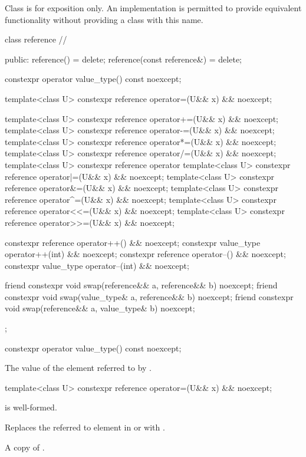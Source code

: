 \pnum
Class  is for exposition only. An implementation is permitted to provide equivalent functionality without providing a class with this name.

\begin{codeblock}
class reference // \expos
{
public:
  reference() = delete;
  reference(const reference&) = delete;

  constexpr operator value_type() const noexcept;

  template<class U> constexpr reference operator=(U&& x) && noexcept;

  template<class U> constexpr reference operator+=(U&& x) && noexcept;
  template<class U> constexpr reference operator-=(U&& x) && noexcept;
  template<class U> constexpr reference operator*=(U&& x) && noexcept;
  template<class U> constexpr reference operator/=(U&& x) && noexcept;
  template<class U> constexpr reference operator%
  template<class U> constexpr reference operator|=(U&& x) && noexcept;
  template<class U> constexpr reference operator&=(U&& x) && noexcept;
  template<class U> constexpr reference operator^=(U&& x) && noexcept;
  template<class U> constexpr reference operator<<=(U&& x) && noexcept;
  template<class U> constexpr reference operator>>=(U&& x) && noexcept;

  constexpr reference operator++() && noexcept;
  constexpr value_type operator++(int) && noexcept;
  constexpr reference operator--() && noexcept;
  constexpr value_type operator--(int) && noexcept;

  friend constexpr void swap(reference&& a, reference&& b) noexcept;
  friend constexpr void swap(value_type& a, reference&& b) noexcept;
  friend constexpr void swap(reference&& a, value_type& b) noexcept;
};
\end{codeblock}

\begin{itemdecl}
constexpr operator value_type() const noexcept;
\end{itemdecl}

\begin{itemdescr}
  \pnum\returns
  The value of the element referred to by .
\end{itemdescr}

\begin{itemdecl}
template<class U> constexpr reference operator=(U&& x) && noexcept;
\end{itemdecl}

\begin{itemdescr}
  \pnum\constraints
   is well-formed.

  \pnum\effects
  Replaces the referred to element in  or  with .

  \pnum\returns
  A copy of .
\end{itemdescr}

